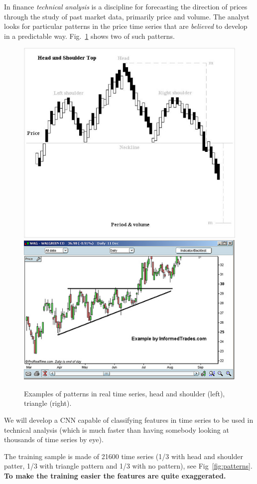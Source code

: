In finance \emph{technical analysis} is a discipline for forecasting the direction of prices through the study of past market data, primarily price and volume. The analyst looks for particular patterns in the price time series that are \emph{believed} to develop in a predictable way. Fig.~\ref{fig:tech_ana} shows two of such patterns.

\begin{figure}[htb]
\centering
\includegraphics[width=0.4\linewidth]{figures/H_and_s_top_new.jpg}\qquad
\includegraphics[width=0.4\linewidth]{figures/Triangle-ascending.jpg}
\caption{Examples of patterns in real time series, head and shoulder (left), triangle (right).}
\label{fig:tech_ana}
\end{figure}

We will develop a CNN capable of classifying features in time series to be used in technical analysis (which is much faster than having somebody looking at thousands of time series by eye).

The training sample is made of 21600 time series (1/3 with head and shoulder patter, 1/3 with triangle pattern and 1/3 with no pattern), see Fig~\ref{fig:patterns}. \textbf{To make the training easier the features are quite exaggerated.}

